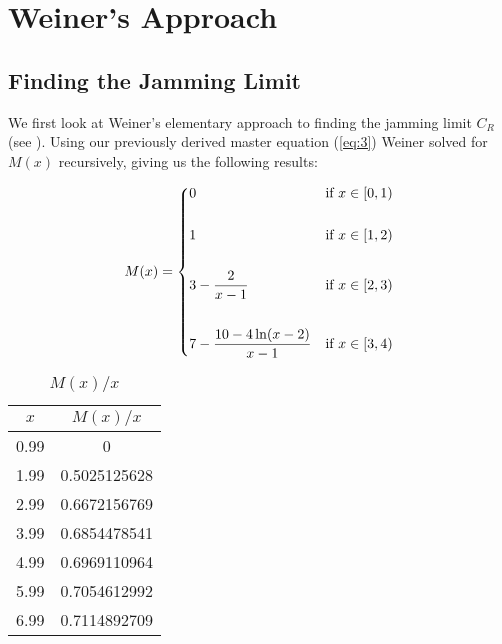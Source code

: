 
\chapter{Weiner's Approach}











\section{Finding the Jamming Limit}

We first look at Weiner's elementary approach to finding the jamming limit $C_R$ 
(see \cite{weiner1969elementary}). Using our previously derived master equation 
(\ref{eq:3}) Weiner solved for $M(x)$ recursively, giving us the following 
results: \bigskip

\begin{eqnarray} \label{eq:4}
	M(x) = 
	\begin{dcases}
		0                                   & \text{if } x \in [0, 1) \\\\
		1                                   & \text{if } x \in [1, 2) \\\\
		3 - \frac{2}{x - 1}                 & \text{if } x \in [2, 3) \\\\
		7 - \frac{10 - 4 \ln(x - 2)}{x - 1} & \text{if } x \in [3, 4)
	\end{dcases}
\end{eqnarray}\medskip

\begin{table}[t!]
	\centering
	\begin{tabular}{|c | c|} 
		\hline
		$x$ & $M(x) / x$ \\ [1ex] 
		\hline
		0.99 & 0 \\ 
		1.99 & 0.5025125628 \\ 
		2.99 & 0.6672156769 \\ 
		3.99 & 0.6854478541 \\ 
		4.99 & 0.6969110964 \\ 
		5.99 & 0.7054612992 \\ 
		6.99 & 0.7114892709 \\  
		\hline
	\end{tabular}
	\caption{$M(x) / x$}
	\label{table:1}
\end{table}\medskip

